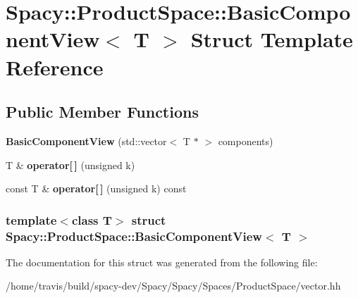 \hypertarget{structSpacy_1_1ProductSpace_1_1BasicComponentView}{\section{\-Spacy\-:\-:\-Product\-Space\-:\-:\-Basic\-Component\-View$<$ \-T $>$ \-Struct \-Template \-Reference}
\label{structSpacy_1_1ProductSpace_1_1BasicComponentView}
}
\subsection*{\-Public \-Member \-Functions}
\begin{DoxyCompactItemize}
\item 
\hypertarget{structSpacy_1_1ProductSpace_1_1BasicComponentView_a00b63d0532ba0c10157f655cb010d66f}{{\bfseries \-Basic\-Component\-View} (std\-::vector$<$ \-T $\ast$ $>$ components)}\label{structSpacy_1_1ProductSpace_1_1BasicComponentView_a00b63d0532ba0c10157f655cb010d66f}

\item 
\hypertarget{structSpacy_1_1ProductSpace_1_1BasicComponentView_a4c95c8eb67ae959ddb718076760d96c5}{\-T \& {\bfseries operator\mbox{[}$\,$\mbox{]}} (unsigned k)}\label{structSpacy_1_1ProductSpace_1_1BasicComponentView_a4c95c8eb67ae959ddb718076760d96c5}

\item 
\hypertarget{structSpacy_1_1ProductSpace_1_1BasicComponentView_ac5b900dd6b8e445581c2b51c0242c95c}{const \-T \& {\bfseries operator\mbox{[}$\,$\mbox{]}} (unsigned k) const }\label{structSpacy_1_1ProductSpace_1_1BasicComponentView_ac5b900dd6b8e445581c2b51c0242c95c}

\end{DoxyCompactItemize}
\subsubsection*{template$<$class T$>$ struct Spacy\-::\-Product\-Space\-::\-Basic\-Component\-View$<$ T $>$}



\-The documentation for this struct was generated from the following file\-:\begin{DoxyCompactItemize}
\item 
/home/travis/build/spacy-\/dev/\-Spacy/\-Spacy/\-Spaces/\-Product\-Space/vector.\-hh\end{DoxyCompactItemize}
